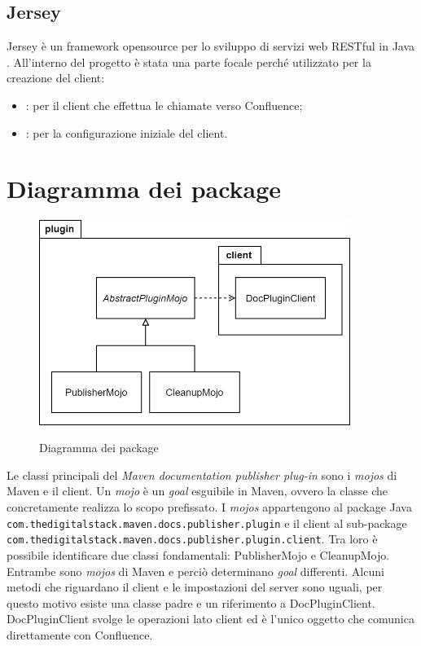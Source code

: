 \subsection{Jersey} %
Jersey è un framework opensource per lo sviluppo di servizi web RESTful in Java \cite{site:jersey}.
All'interno del progetto è stata una parte focale perché utilizzato per la creazione del client:
\begin{itemize}
    \item {}: per il client che effettua le chiamate verso Confluence;
    \item {}: per la configurazione iniziale del client.
\end{itemize}

\clearpage

\section{Diagramma dei package}
\label{sec:diagramma-package}
\begin{figure}[H]
    \centering
    \includegraphics[width=0.9\textwidth]{immagini/PackageDiagram.png}\\
    \caption{Diagramma dei package}
\end{figure}
Le classi principali del \emph{Maven documentation publisher plug-in} sono i \emph{mojos} di Maven e il client.
Un \emph{mojo} è un \emph{goal} esguibile in Maven, ovvero la classe che concretamente realizza lo scopo prefissato.
I \emph{mojos} appartengono al package Java \texttt{com.thedigitalstack.maven.docs.publisher.plugin} e il client al sub-package\\ \texttt{com.thedigitalstack.maven.docs.publisher.plugin.client}.
Tra loro è possibile identificare due classi fondamentali: PublisherMojo e CleanupMojo.
Entrambe sono \emph{mojos} di Maven e perciò determinano \emph{goal} differenti.
Alcuni metodi che riguardano il client e le impostazioni del server sono uguali, per questo motivo esiste una classe padre e un riferimento a DocPluginClient.
DocPluginClient svolge le operazioni lato client ed è l'unico oggetto che comunica direttamente con Confluence.

